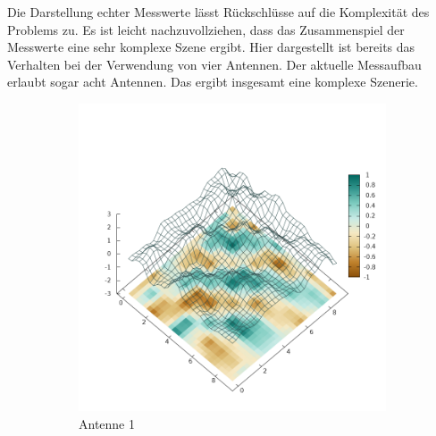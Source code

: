 Die Darstellung echter Messwerte lässt Rückschlüsse auf die Komplexität des Problems zu. Es ist leicht nachzuvollziehen, dass das Zusammenspiel der Messwerte eine sehr komplexe Szene ergibt. Hier dargestellt ist bereits das Verhalten bei der Verwendung von vier Antennen. Der aktuelle Messaufbau erlaubt sogar acht Antennen. Das ergibt insgesamt eine komplexe Szenerie.\\
%
\begin{figure}[ht!]
        \centering
        \begin{subfigure}[b]{0.4\textwidth}
            \centering
            \includegraphics[width=\textwidth]{img/Plate0_A1.png}
            \caption[lorem]{Antenne 1}
            \label{fig:Plate0_A1}
        \end{subfigure}%
\\
        \begin{subfigure}[b]{0.4\textwidth}
            \centering

\end{subfigure}
\end{figure}
